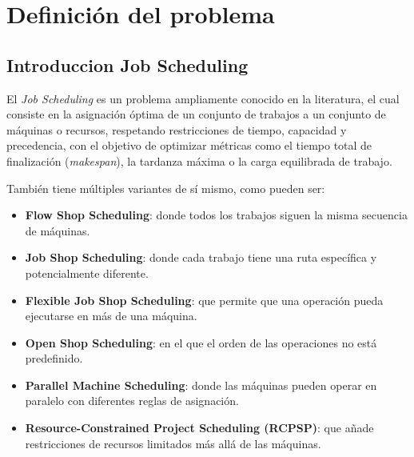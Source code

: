 \documentclass[preprint,12pt,authoryear]{elsarticle}
\begin{document}


\section{Definición del problema}


\subsection{Introduccion Job Scheduling}
El \textit{Job Scheduling} es un problema ampliamente conocido en la literatura, el cual consiste en la asignación óptima de un conjunto de trabajos a un conjunto de máquinas o recursos, respetando restricciones de tiempo, capacidad y precedencia, con el objetivo de optimizar métricas como el tiempo total de finalización (\textit{makespan}), la tardanza máxima o la carga equilibrada de trabajo.

También tiene múltiples variantes de sí mismo, como pueden ser:

\begin{itemize}
    \item \textbf{Flow Shop Scheduling}: donde todos los trabajos siguen la misma secuencia de máquinas.
    \item \textbf{Job Shop Scheduling}: donde cada trabajo tiene una ruta específica y potencialmente diferente.
    \item \textbf{Flexible Job Shop Scheduling}: que permite que una operación pueda ejecutarse en más de una máquina.
    \item \textbf{Open Shop Scheduling}: en el que el orden de las operaciones no está predefinido.
    \item \textbf{Parallel Machine Scheduling}: donde las máquinas pueden operar en paralelo con diferentes reglas de asignación.
    \item \textbf{Resource-Constrained Project Scheduling (RCPSP)}: que añade restricciones de recursos limitados más allá de las máquinas.
    
\end{itemize}
\end{document}
